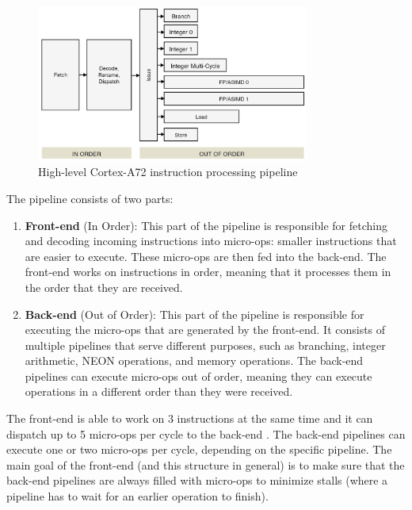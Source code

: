 \documentclass[11pt,a4paper]{report}
\theoremstyle{definition}
\begin{document}
\begin{figure}
  \centering
  \includegraphics[width=0.8\textwidth]{armv8/Cortex-A72-pipeline-simplified.jpg}
  \caption{High-level Cortex-A72 instruction processing pipeline \cite{CortexA72OptGuide}}
  \label{fig:cortexa72pipeline}
\end{figure}

The pipeline consists of two parts:
\begin{enumerate}
  \item \textbf{Front-end} (In Order): This part of the pipeline is responsible for fetching and decoding incoming instructions into micro-ops: smaller instructions that are easier to execute. These micro-ops are then fed into the back-end. The front-end works on instructions in order, meaning that it processes them in the order that they are received.
  \item \textbf{Back-end} (Out of Order): This part of the pipeline is responsible for executing the micro-ops that are generated by the front-end. It consists of multiple pipelines that serve different purposes, such as branching, integer arithmetic, NEON operations, and memory operations. The back-end pipelines can execute micro-ops out of order, meaning they can execute operations in a different order than they were received.
\end{enumerate}

The front-end is able to work on 3 instructions at the same time and it can dispatch up to 5 micro-ops per cycle to the back-end \cite{SandSoftwaresound2024}. The back-end pipelines can execute one or two micro-ops per cycle, depending on the specific pipeline. The main goal of the front-end (and this structure in general) is to make sure that the back-end pipelines are always filled with micro-ops to minimize stalls (where a pipeline has to wait for an earlier operation to finish).
\end{document}
